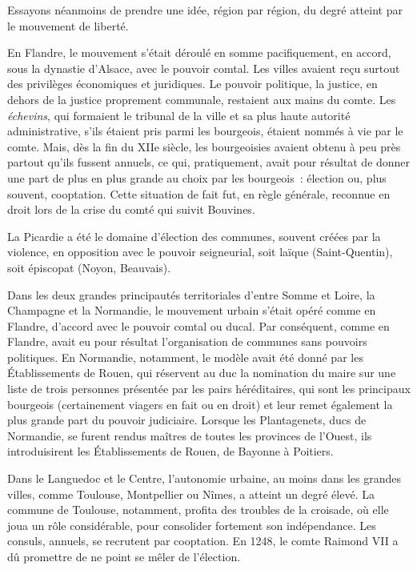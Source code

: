 \documentclass[french,twoside]{book} %
\begin{document}
\noindent Essayons néanmoins de prendre une idée, région par région, du degré atteint par le mouvement de liberté.\par
En Flandre, le mouvement s’était déroulé en somme pacifiquement, en accord, sous la dynastie d’Alsace, avec le pouvoir comtal. Les villes avaient reçu surtout des privilèges économiques et juridiques. Le pouvoir politique, la justice, en dehors de la justice proprement communale, restaient aux mains du comte. Les \emph{échevins}, qui formaient le tribunal de la ville et sa plus haute autorité administrative, s’ils étaient pris parmi les bourgeois, étaient nommés à vie par le comte. Mais, dès la fin du XIIe siècle, les bourgeoisies avaient obtenu à peu près partout qu’ils fussent annuels, ce qui,  
\label{p73} pratiquement, avait pour résultat de donner une part de plus en plus grande au choix par les bourgeois : élection ou, plus souvent, cooptation. Cette situation de fait fut, en règle générale, reconnue en droit lors de la crise du comté qui suivit Bouvines.\par
La Picardie a été le domaine d’élection des communes, souvent créées par la violence, en opposition avec le pouvoir seigneurial, soit laïque (Saint-Quentin), soit épiscopat (Noyon, Beauvais).\par
Dans les deux grandes principautés territoriales d’entre Somme et Loire, la Champagne et la Normandie, le mouvement urbain s’était opéré comme en Flandre, d’accord avec le pouvoir comtal ou ducal. Par conséquent, comme en Flandre, avait eu pour résultat l’organisation de communes sans pouvoirs politiques. En Normandie, notamment, le modèle avait été donné par les Établissements de Rouen, qui réservent au duc la nomination du maire sur une liste de trois personnes présentée par les pairs héréditaires, qui sont les principaux bourgeois (certainement viagers en fait ou en droit) et leur remet également la plus grande part du pouvoir judiciaire. Lorsque les Plantagenets, ducs de Normandie, se furent rendus maîtres de toutes les provinces de l’Ouest, ils introduisirent les Établissements de Rouen, de Bayonne à Poitiers.\par
Dans le Languedoc et le Centre, l’autonomie urbaine, au moins dans les grandes villes, comme Toulouse, Montpellier ou Nîmes, a atteint un degré élevé. La commune de Toulouse, notamment, profita des troubles de la croisade, où elle joua un rôle considérable, pour consolider fortement son indépendance. Les consuls, annuels, se recrutent par cooptation. En 1248, le comte Raimond VII a dû promettre de ne point se mêler de l’élection.\par
\end{document}
